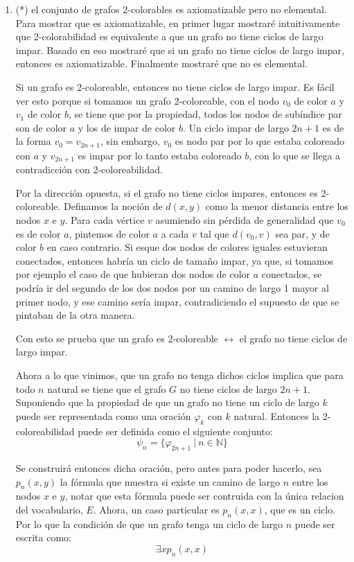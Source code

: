 \documentclass[letterpaper,10pt]{article}
\begin{document}
\begin{enumerate}
    \item (*) el conjunto de grafos 2-colorables es axiomatizable pero no elemental. Para mostrar que es axiomatizable, en primer lugar mostraré intuitivamente que 2-colorabilidad es equivalente a que un grafo no tiene ciclos de largo impar. Basado en eso mostraré que si un grafo no tiene ciclos de largo impar, entonces es axiomatizable. Finalmente mostraré que no es elemental.

    Si un grafo es 2-coloreable, entonces no tiene ciclos de largo impar. Es fácil ver esto porque si tomamos un grafo 2-coloreable, con el nodo $v_0$ de color $a$ y $v_1$ de color $b$, se tiene que por la propiedad, todos los nodos de subíndice par son de color $a$ y los de impar de color $b$. Un ciclo impar de largo $2n + 1$ es de la forma $v_0 = v_{2n+1}$, sin embargo, $v_0$ es nodo par por lo que estaba coloreado con $a$ y $v_{2n+1}$ es impar por lo tanto estaba coloreado $b$, con lo que se llega a contradicción con 2-coloreabilidad.

    Por la dirección opuesta, si el grafo no tiene ciclos impares, entonces es 2-coloreable. Definamos la noción de $d(x,y)$ como la menor distancia entre los nodos $x$ e $y$. Para cada vértice $v$ asumiendo sin pérdida de generalidad que $v_0$ es de color $a$, pintemos de color $a$ a cada $v$ tal que $d(v_0, v)$ sea par, y de color $b$ en caso contrario. Si esque dos nodos de colores iguales estuvieran conectados, entonces habría un ciclo de tamaño impar, ya que, si tomamos por ejemplo el caso de que hubieran dos nodos de color $a$ conectados, se podría ir del segundo de los dos nodos por un camino de largo 1 mayor al primer nodo, y ese camino sería impar, contradiciendo el supuesto de que se pintaban de la otra manera.

    Con esto se prueba que un grafo es 2-coloreable $\leftrightarrow$ el grafo no tiene ciclos de largo impar.

    Ahora a lo que vinimos, que un grafo no tenga dichos ciclos implica que para todo $n$ natural se tiene que el grafo $G$ no tiene ciclos de largo $2n+1$. Suponiendo que la propiedad de que un grafo no tiene un ciclo de largo $k$ puede ser representada como una oración $\varphi_k$ con $k$ natural. Entonces la 2-coloreabilidad puede ser definida como el siguiente conjunto:
    $$\psi_n = \{\varphi_{2n+1} \ | \ n \in \mathbb{N}\}$$

    Se construirá entonces dicha oración, pero antes para poder hacerlo, sea $p_n(x,y)$ la fórmula que muestra si existe un camino de largo $n$ entre los nodos $x$ e $y$, notar que esta fórmula puede ser contruida con la única relacion del vocabulario, $E$. Ahora, un caso particular es $p_n(x,x)$, que es un ciclo. Por lo que la condición de que un grafo tenga un ciclo de largo $n$ puede ser escrita como:
    $$\exists x p_n(x, x)$$


\end{enumerate}
\end{document}
